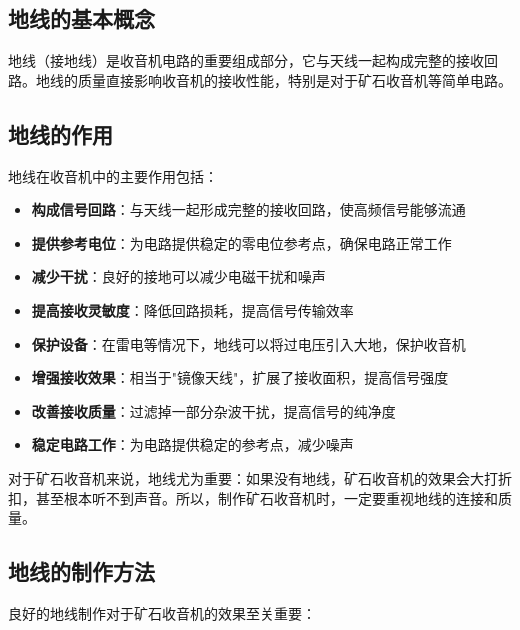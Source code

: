 \documentclass[12pt,UTF8]{ctexbook}
\begin{document}
\subsection{地线的基本概念}

地线（接地线）是收音机电路的重要组成部分，它与天线一起构成完整的接收回路。地线的质量直接影响收音机的接收性能，特别是对于矿石收音机等简单电路。

\subsection{地线的作用}

地线在收音机中的主要作用包括：

\begin{itemize}[leftmargin=3.5em]
    \item \textbf{构成信号回路}：与天线一起形成完整的接收回路，使高频信号能够流通
    \item \textbf{提供参考电位}：为电路提供稳定的零电位参考点，确保电路正常工作
    \item \textbf{减少干扰}：良好的接地可以减少电磁干扰和噪声
    \item \textbf{提高接收灵敏度}：降低回路损耗，提高信号传输效率
    \item \textbf{保护设备}：在雷电等情况下，地线可以将过电压引入大地，保护收音机
    \item \textbf{增强接收效果}：相当于"镜像天线"，扩展了接收面积，提高信号强度
    \item \textbf{改善接收质量}：过滤掉一部分杂波干扰，提高信号的纯净度
    \item \textbf{稳定电路工作}：为电路提供稳定的参考点，减少噪声
\end{itemize}

对于矿石收音机来说，地线尤为重要：如果没有地线，矿石收音机的效果会大打折扣，甚至根本听不到声音。所以，制作矿石收音机时，一定要重视地线的连接和质量。

\subsection{地线的制作方法}

良好的地线制作对于矿石收音机的效果至关重要：
\end{document}
